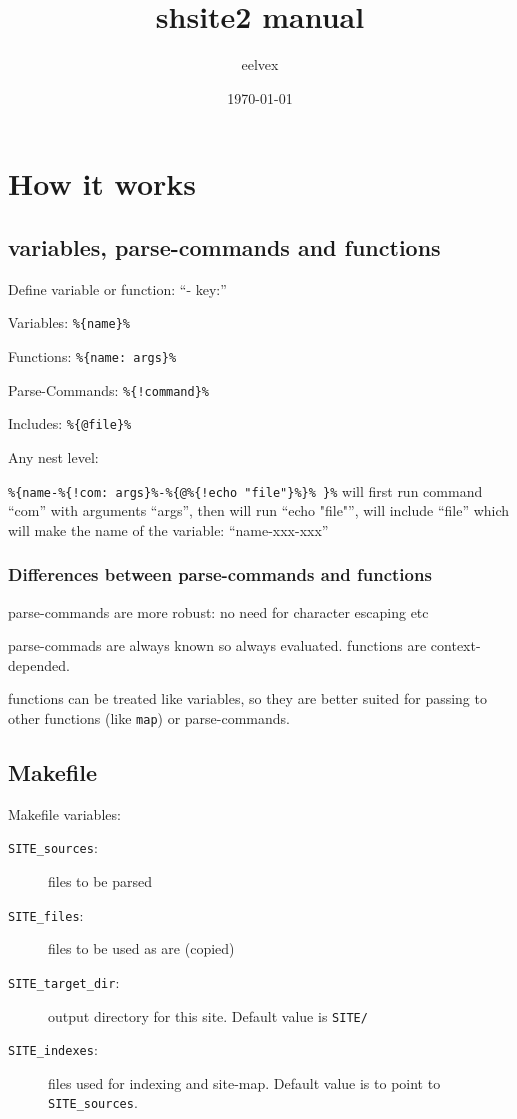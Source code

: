 \documentclass{memoir}
\title{shsite2 manual}
\author{eelvex}
\date{\today}
\newcommand{\var}[1]{\texttt{\%\{#1\}\%}}
\begin{document}
\begin{titlingpage}
\maketitle
\end{titlingpage}
\tableofcontents

\chapter{How it works} %

\section{variables, parse-commands and functions} %

	Define variable or function: ``- key:''

	Variables: \var{name}

	Functions: \var{name: args}

	Parse-Commands: \var{!command}

	Includes:  \var{@file}

	Any nest level:

	\var{name-\var{!com: args}-\var{@\var{!echo "file"}} }
	will first run command ``com'' with arguments ``args'', then will run ``echo "file"'', will include ``file''
	which will make the name of the variable: ``name-xxx-xxx''

	\subsection{Differences between parse-commands and functions} %
		parse-commands are more robust: no need for character escaping etc

		parse-commads are always known so always evaluated. functions are context-depended.

		functions can be treated like variables, so they are better
		suited for passing to other functions (like \texttt{map}) or parse-commands.




\section{Makefile} %

Makefile variables:
\begin{description}
\item[\texttt{SITE\_sources}:] files to be parsed
\item[\texttt{SITE\_files}:] files to be used as are (copied)
\item[\texttt{SITE\_target\_dir}:] output directory for this site. Default value is \texttt{SITE/}
\item[\texttt{SITE\_indexes}:] files used for indexing and site-map. Default value is to point to \texttt{SITE\_sources}.
\end{description}
\end{document}
